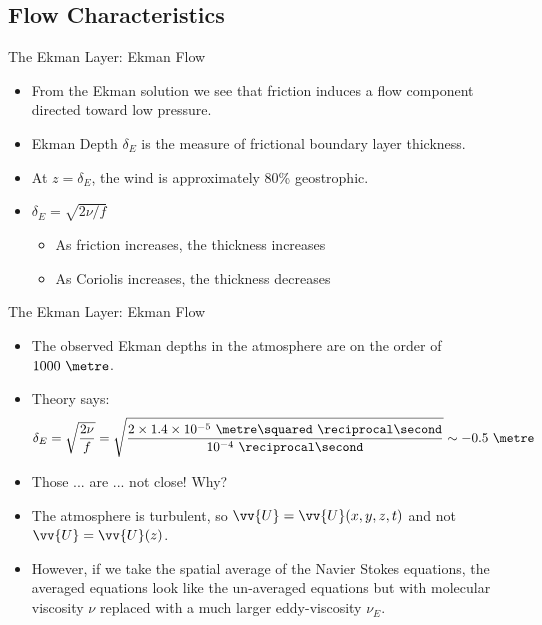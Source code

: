 \subsection{Flow Characteristics}
\begin{frame}{The Ekman Layer: Ekman Flow}

\begin{itemize}
	\item From the Ekman solution we see that friction induces a flow component directed toward low pressure.
	\item Ekman Depth $\delta_E$ is the measure of frictional boundary layer thickness.
	\item At $z=\delta_E$, the wind is approximately 80\% geostrophic.
	\item $\delta_E = \sqrt{2\nu/f}$
	\begin{itemize}
	\item As friction increases, the thickness increases
	\item As Coriolis increases, the thickness decreases
	\end{itemize}
\end{itemize}
\end{frame}
\begin{frame}{The Ekman Layer: Ekman Flow}

\begin{itemize}
	\item The observed Ekman depths in the atmosphere are on the order of $1000\ \metre$.
	\item Theory says:
	$$\delta_E = \sqrt{\frac{2\nu}{f}} = \sqrt{\frac{2\times 1.4 \times 10^{-5}\ \metre\squared\ \reciprocal\second}{10^{-4}\ \reciprocal\second}} \sim -0.5\ \metre$$
	\item Those ... are ... not close! Why?
	\item The atmosphere is turbulent, so $\vv{U} = \vv{U}(x,y,z,t)$ and not $\vv{U}=\vv{U}(z)$.
	\item However, if we take the spatial average of the Navier Stokes equations, the averaged equations look like the un-averaged equations but with molecular viscosity $\nu$ replaced with a much larger eddy-viscosity $\nu_E$.
\end{itemize}
\end{frame}

